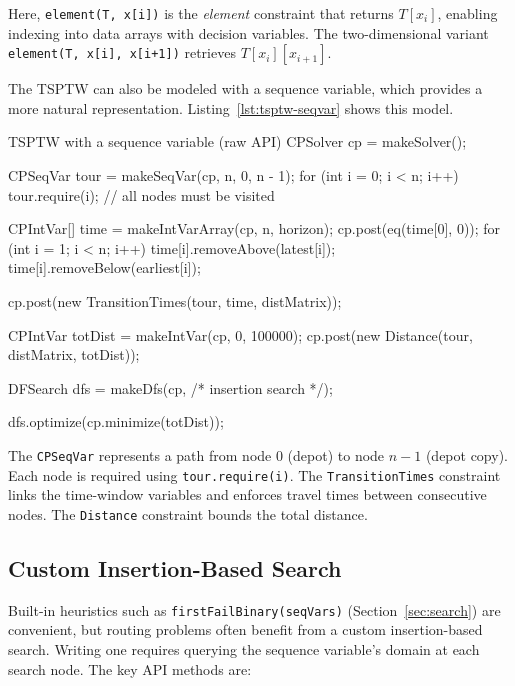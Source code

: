 \documentclass[11pt, a4paper]{scrartcl}
\begin{document}
Here, \texttt{element(T, x[i])} is the \emph{element} constraint that returns $T[x_i]$, enabling indexing into data arrays with decision variables. The two-dimensional variant \texttt{element(T, x[i], x[i+1])} retrieves $T[x_i][x_{i+1}]$.

The TSPTW can also be modeled with a sequence variable, which provides a more natural representation. Listing~\ref{lst:tsptw-seqvar} shows this model.

\begin{codebox}[label={lst:tsptw-seqvar}]{TSPTW with a sequence variable (raw API)}
CPSolver cp = makeSolver();

CPSeqVar tour = makeSeqVar(cp, n, 0, n - 1);
for (int i = 0; i < n; i++)
    tour.require(i);  // all nodes must be visited

CPIntVar[] time = makeIntVarArray(cp, n, horizon);
cp.post(eq(time[0], 0));
for (int i = 1; i < n; i++) {
    time[i].removeAbove(latest[i]);
    time[i].removeBelow(earliest[i]);
}

cp.post(new TransitionTimes(tour, time, distMatrix));

CPIntVar totDist = makeIntVar(cp, 0, 100000);
cp.post(new Distance(tour, distMatrix, totDist));

DFSearch dfs = makeDfs(cp, /* insertion search */);

dfs.optimize(cp.minimize(totDist));
\end{codebox}

The \texttt{CPSeqVar} represents a path from node 0 (depot) to node $n{-}1$ (depot copy). Each node is required using \texttt{tour.require(i)}. The \texttt{TransitionTimes} constraint links the time-window variables and enforces travel times between consecutive nodes. The \texttt{Distance} constraint bounds the total distance.

\subsection{Custom Insertion-Based Search}

Built-in heuristics such as \texttt{firstFailBinary(seqVars)} (Section~\ref{sec:search}) are convenient, but routing problems often benefit from a custom insertion-based search. Writing one requires querying the sequence variable's domain at each search node. The key API methods are:
\end{document}

